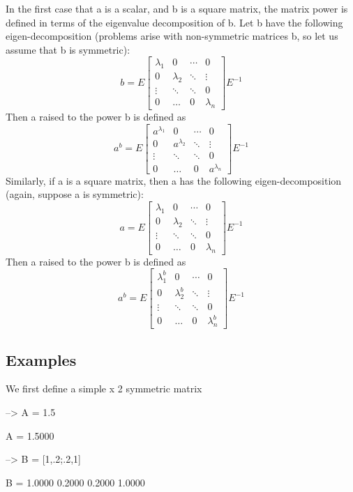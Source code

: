 In the first case that {\ttfamily a} is a scalar, and {\ttfamily b} is a square matrix, the matrix power is defined in terms of the eigenvalue decomposition of {\ttfamily b}. Let {\ttfamily b} have the following eigen-\/decomposition (problems arise with non-\/symmetric matrices {\ttfamily b}, so let us assume that {\ttfamily b} is symmetric)\-: \[ b = E \begin{bmatrix} \lambda_1 & 0 & \cdots & 0 \\ 0 & \lambda_2 & \ddots & \vdots \\ \vdots & \ddots & \ddots & 0 \\ 0 & \hdots & 0 & \lambda_n \end{bmatrix} E^{-1} \] Then {\ttfamily a} raised to the power {\ttfamily b} is defined as \[ a^{b} = E \begin{bmatrix} a^{\lambda_1} & 0 & \cdots & 0 \\ 0 & a^{\lambda_2} & \ddots & \vdots \\ \vdots & \ddots & \ddots & 0 \\ 0 & \hdots & 0 & a^{\lambda_n} \end{bmatrix} E^{-1} \] Similarly, if {\ttfamily a} is a square matrix, then {\ttfamily a} has the following eigen-\/decomposition (again, suppose {\ttfamily a} is symmetric)\-: \[ a = E \begin{bmatrix} \lambda_1 & 0 & \cdots & 0 \\ 0 & \lambda_2 & \ddots & \vdots \\ \vdots & \ddots & \ddots & 0 \\ 0 & \hdots & 0 & \lambda_n \end{bmatrix} E^{-1} \] Then {\ttfamily a} raised to the power {\ttfamily b} is defined as \[ a^{b} = E \begin{bmatrix} \lambda_1^b & 0 & \cdots & 0 \\ 0 & \lambda_2^b & \ddots & \vdots \\ \vdots & \ddots & \ddots & 0 \\ 0 & \hdots & 0 & \lambda_n^b \end{bmatrix} E^{-1} \] \hypertarget{variables_matrix_Examples}{}\subsection{Examples}\label{variables_matrix_Examples}
We first define a simple { x 2} symmetric matrix


\begin{DoxyVerbInclude}
--> A = 1.5

A = 
    1.5000 

--> B = [1,.2;.2,1]

B = 
    1.0000    0.2000 
    0.2000    1.0000 
\end{DoxyVerbInclude}



